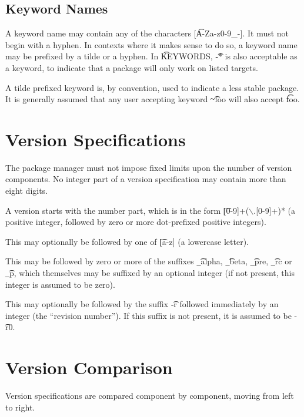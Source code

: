 \subsection{Keyword Names}
\label{keyword-names}
A keyword name may contain any of the characters [\t{A-Za-z0-9\_-}]. It must not begin with a
hyphen. In contexts where it makes sense to do so, a keyword name may be prefixed by
a tilde or a hyphen. In \t{KEYWORDS}, \t{-*} is also acceptable as a keyword, to indicate that
a package will only work on listed targets.

A tilde prefixed keyword is, by convention, used to indicate a less stable package. It is generally
assumed that any user accepting keyword \t{\textasciitilde{}foo} will also accept \t{foo}.

\section{Version Specifications}
The package manager must not impose fixed limits upon the number of version components. No
integer part of a version specification may contain more than eight digits.

A version starts with the number part, which is in the form \t{[0-9]+($\backslash$.[0-9]+)*} (a positive
integer, followed by zero or more dot-prefixed positive integers).

This may optionally be followed by one of \t{[a-z]} (a lowercase letter).

This may be followed by zero or more of the suffixes \t{\_alpha}, \t{\_beta}, \t{\_pre},
\t{\_rc} or \t{\_p}, which themselves may be suffixed by an optional integer (if not present,
this integer is assumed to be zero).

This may optionally be followed by the suffix \t{-r} followed immediately by an integer (the
``revision number''). If this suffix is not present, it is assumed to be \t{-r0}.


\section{Version Comparison}

Version specifications are compared component by component, moving from left to right.

